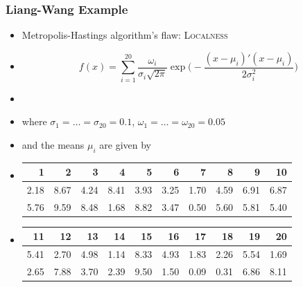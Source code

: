 \documentclass[xetex]{beamer}
\begin{document}
	\begin{frame}[t]\frametitle{Liang-Wang Example}

		\begin{itemize}
			\item[] 	Metropolis-Hastings algorithm's flaw: \textsc{Localness}
			\item[] 	$$ f(x) = 
				\sum_{i=1}^{20} \frac{\omega_i}{ \sigma_i \sqrt{2 \pi} } \exp \Big( -\frac{(x - \mu_i)'(x - \mu_i)}{2 \sigma_i^2} \Big) $$
			\item[]
			\item[] 	where $\sigma_1 = \dots = \sigma_{20} = 0.1$, $\omega_1 = \dots = \omega_{20} = 0.05 $
			\item[] 	and the means $\mu_i$ are given by
			\item[] 
			\begin{table}[ht]
				\centering
				\begin{tabular}{rrrrrrrrrr}
				  \hline
					1 & 2 & 3 & 4 & 5 & 6 & 7 & 8 & 9 & 10 \\ 
				  \hline
					2.18 & 8.67 & 4.24 & 8.41 & 3.93 & 3.25 & 1.70 & 4.59 & 6.91 & 6.87 \\ 
				  	5.76 & 9.59 & 8.48 & 1.68 & 8.82 & 3.47 & 0.50 & 5.60 & 5.81 & 5.40 \\ 
				   \hline
				\end{tabular}
			\end{table}
			\item[]
			\begin{table}[ht]
				\centering
				\begin{tabular}{rrrrrrrrrr}
				  \hline
					11 & 12 & 13 & 14 & 15 & 16 & 17 & 18 & 19 & 20 \\ 
				  \hline
					5.41 & 2.70 & 4.98 & 1.14 & 8.33 & 4.93 & 1.83 & 2.26 & 5.54 & 1.69 \\ 
					2.65 & 7.88 & 3.70 & 2.39 & 9.50 & 1.50 & 0.09 & 0.31 & 6.86 & 8.11 \\ 
				   \hline
				\end{tabular}
			\end{table}
		\end{itemize} 			
	
	\end{frame}

\end{document}
